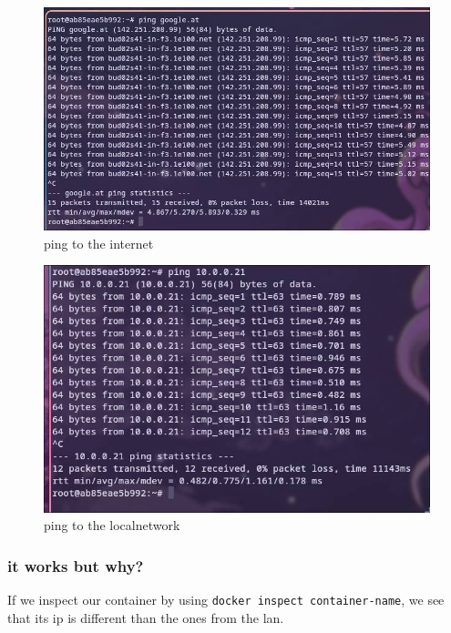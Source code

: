 \documentclass[a4paper]{article}
\begin{document}
\begin{figure}[h]
	\centering
	\includegraphics[scale=0.3]{images/ping_internet.png}
	\caption{ping to the internet}
\end{figure}
\begin{figure}[h]
	\centering
	\includegraphics[scale=0.3]{images/ping_lokal.png}
	\caption{ping to the localnetwork}
\end{figure}
\newpage
\subsubsection {it works but why?}

If we inspect our container by using \texttt{docker inspect container-name}, we see that its ip is different than the ones from the lan.
\end{document}
